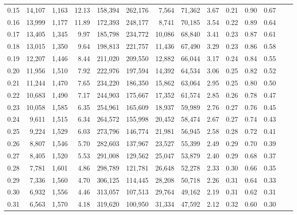 \begin{tabular}{rrrrrrrrrrrrrr}
0.15 &  14,107 &  1,163 &   12.13 &  158,394 &  262,176 &   7,564 &  71,362 &  3.67 &  0.21 &  0.90 &      0.67 \\
0.16 &  13,999 &  1,177 &   11.89 &  172,393 &  248,177 &   8,741 &  70,185 &  3.54 &  0.22 &  0.89 &      0.64 \\
0.17 &  13,405 &  1,345 &    9.97 &  185,798 &  234,772 &  10,086 &  68,840 &  3.41 &  0.23 &  0.87 &      0.61 \\
0.18 &  13,015 &  1,350 &    9.64 &  198,813 &  221,757 &  11,436 &  67,490 &  3.29 &  0.23 &  0.86 &      0.58 \\
0.19 &  12,207 &  1,446 &    8.44 &  211,020 &  209,550 &  12,882 &  66,044 &  3.17 &  0.24 &  0.84 &      0.55 \\
0.20 &  11,956 &  1,510 &    7.92 &  222,976 &  197,594 &  14,392 &  64,534 &  3.06 &  0.25 &  0.82 &      0.52 \\
0.21 &  11,244 &  1,470 &    7.65 &  234,220 &  186,350 &  15,862 &  63,064 &  2.95 &  0.25 &  0.80 &      0.50 \\
0.22 &  10,683 &  1,490 &    7.17 &  244,903 &  175,667 &  17,352 &  61,574 &  2.85 &  0.26 &  0.78 &      0.47 \\
0.23 &  10,058 &  1,585 &    6.35 &  254,961 &  165,609 &  18,937 &  59,989 &  2.76 &  0.27 &  0.76 &      0.45 \\
0.24 &   9,611 &  1,515 &    6.34 &  264,572 &  155,998 &  20,452 &  58,474 &  2.67 &  0.27 &  0.74 &      0.43 \\
0.25 &   9,224 &  1,529 &    6.03 &  273,796 &  146,774 &  21,981 &  56,945 &  2.58 &  0.28 &  0.72 &      0.41 \\
0.26 &   8,807 &  1,546 &    5.70 &  282,603 &  137,967 &  23,527 &  55,399 &  2.49 &  0.29 &  0.70 &      0.39 \\
0.27 &   8,405 &  1,520 &    5.53 &  291,008 &  129,562 &  25,047 &  53,879 &  2.40 &  0.29 &  0.68 &      0.37 \\
0.28 &   7,781 &  1,601 &    4.86 &  298,789 &  121,781 &  26,648 &  52,278 &  2.33 &  0.30 &  0.66 &      0.35 \\
0.29 &   7,336 &  1,560 &    4.70 &  306,125 &  114,445 &  28,208 &  50,718 &  2.26 &  0.31 &  0.64 &      0.33 \\
0.30 &   6,932 &  1,556 &    4.46 &  313,057 &  107,513 &  29,764 &  49,162 &  2.19 &  0.31 &  0.62 &      0.31 \\
0.31 &   6,563 &  1,570 &    4.18 &  319,620 &  100,950 &  31,334 &  47,592 &  2.12 &  0.32 &  0.60 &      0.30 \\

\end{tabular}
